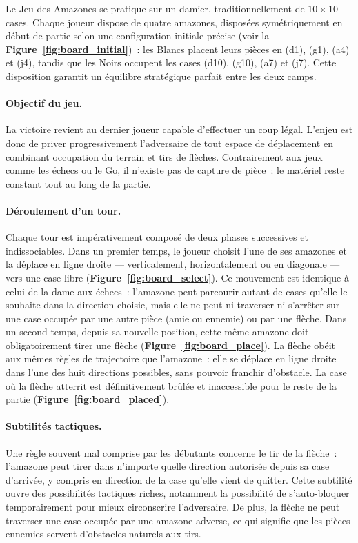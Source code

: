 \documentclass[a4paper]{article}
\begin{document}
Le Jeu des Amazones se pratique sur un damier, traditionnellement de
$10 \times 10$ cases. Chaque joueur dispose de quatre amazones, disposées
symétriquement en début de partie selon une configuration initiale précise (voir la \textbf{Figure~\ref{fig:board_initial}})~:
les Blancs placent leurs pièces en (d1), (g1), (a4) et (j4), tandis que les
Noirs occupent les cases (d10), (g10), (a7) et (j7). Cette disposition
garantit un équilibre stratégique parfait entre les deux camps.

\paragraph{Objectif du jeu.}
La victoire revient au dernier joueur capable d'effectuer un coup légal.
L'enjeu est donc de priver progressivement l'adversaire de tout espace de
déplacement en combinant occupation du terrain et tirs de flèches. Contrairement
aux jeux comme les échecs ou le Go, il n'existe pas de capture de pièce~: le
matériel reste constant tout au long de la partie.

\paragraph{Déroulement d'un tour.}
Chaque tour est impérativement composé de deux phases successives et
indissociables. Dans un premier temps, le joueur choisit l'une de ses
amazones et la déplace en ligne droite --- verticalement, horizontalement ou
en diagonale --- vers une case libre (\textbf{Figure~\ref{fig:board_select}}). Ce mouvement est identique à celui de
la dame aux échecs~: l'amazone peut parcourir autant de cases qu'elle le
souhaite dans la direction choisie, mais elle ne peut ni traverser ni
s'arrêter sur une case occupée par une autre pièce (amie ou ennemie) ou par
une flèche. Dans un second temps, depuis sa nouvelle position, cette même
amazone doit obligatoirement tirer une flèche (\textbf{Figure~\ref{fig:board_place}}). La flèche obéit aux mêmes
règles de trajectoire que l'amazone~: elle se déplace en ligne droite dans
l'une des huit directions possibles, sans pouvoir franchir d'obstacle. La
case où la flèche atterrit est définitivement brûlée et inaccessible pour le
reste de la partie (\textbf{Figure~\ref{fig:board_placed}}).

\paragraph{Subtilités tactiques.}
Une règle souvent mal comprise par les débutants concerne le tir de la
flèche~: l'amazone peut tirer dans n'importe quelle direction autorisée
depuis sa case d'arrivée, y compris en direction de la case qu'elle vient
de quitter. Cette subtilité ouvre des possibilités tactiques riches, notamment
la possibilité de s'auto-bloquer temporairement pour mieux circonscrire
l'adversaire. De plus, la flèche ne peut traverser une case occupée par
une amazone adverse, ce qui signifie que les pièces ennemies servent
d'obstacles naturels aux tirs.
\end{document}
